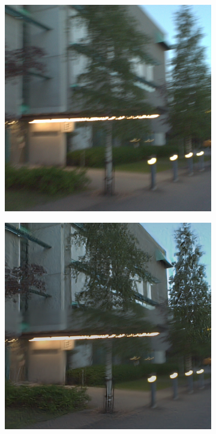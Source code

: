 \documentclass[10pt,twocolumn,letterpaper]{article}
\begin{document}
\vspace{-1cm}
\begin{figure}[h]
  \centering
  \begin{subfigure}{.5\columnwidth}
    \centering
    \includegraphics[width=\linewidth]{images/entrance.png}
  \end{subfigure}%
  \hfill
  \begin{subfigure}{.5\columnwidth}
    \centering
    \includegraphics[width=\linewidth]{images/entrance_dg.png}
  \end{subfigure}%
  \hfill
\end{figure}
\end{document}
